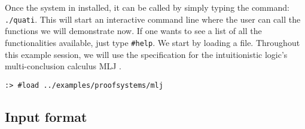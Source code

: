 \documentclass{llncs}
\begin{document}
Once the system in installed, it can be called by simply typing the command:
\texttt{./quati}. This will start an interactive command line where the user can
call the functions we will demonstrate now. If one wants to see a list of all
the functionalities available, just type \texttt{\#help}. We start by loading a
file. Throughout this example session, we will use the specification for the
intuitionistic logic's multi-conclusion calculus MLJ \cite{maehara}.

{\footnotesize
\begin{verbatim}
:> #load ../examples/proofsystems/mlj
\end{verbatim}
}


%


\subsection{Input format}
\end{document}
